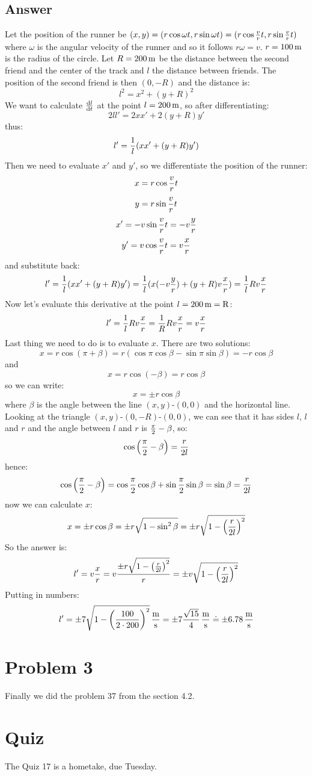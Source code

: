 \documentclass[10pt]{article}
\begin{document}
\subsection*{Answer}

Let the position of the runner be $(x, y)
= (r\cos\omega t, r\sin\omega t)
= (r\cos{v\over r} t, r\sin{v\over r} t)
$
where $\omega$ is the angular velocity of the runner and so it follows
$r\omega=v$. $r=100\rm\,m$ is the radius of the circle. Let $R=200\rm\,m$ be
the distance between the second friend and the center of the track and $l$ the
distance between friends. The position of the second friend is then $(0, -R)$
and the distance is:
$$l^2 = x^2+(y+R)^2$$
We want to calculate ${{\rm d} l\over{\rm d} t}$ at the point $l=200\rm\,m$, so after
differentiating:
$$2ll' = 2xx'+2(y+R)y'$$
thus:
$$l' ={1\over l}( xx'+(y+R)y')$$
Then we need to evaluate $x'$ and $y'$, so we differentiate the position of the
runner:
$$x = r\cos{v\over r} t$$
$$y = r\sin{v\over r} t$$
$$x' = -v\sin{v\over r} t=-v{y\over r}$$
$$y' = v\cos{v\over r} t=v{x\over r}$$
and substitute back:
$$l' =
{1\over l}( xx'+(y+R)y')=
{1\over l}( x(-v{y\over r})+(y+R)v{x\over r})=
{1\over l} Rv{x\over r}
$$
Now let's evaluate this derivative at the point $l=200\rm\,m=R$:
$$l' =
{1\over l} Rv{x\over r}=
{1\over R} Rv{x\over r}=
v{x\over r}
$$
Last thing we need to do is to evaluate $x$. There are two solutions:
$$x = r\cos(\pi+\beta)=r(\cos\pi\cos\beta-\sin\pi\sin\beta)=-r\cos\beta
$$
and
$$x = r\cos(-\beta)=r\cos\beta$$
so we can write:
$$x = \pm r\cos\beta$$
where $\beta$ is the angle between the line $(x, y)$-$(0,0)$ and the horizontal
line. Looking at the triangle $(x, y)$-$(0, -R)$-$(0, 0)$, we can see that it
has sides $l$, $l$ and $r$ and the angle between $l$ and $r$ is ${\pi\over
2}-\beta$, so:
$$\cos\left({\pi\over 2}-\beta\right)={r\over2l}$$
hence:
$$
\cos\left({\pi\over 2}-\beta\right)=
\cos{\pi\over 2}\cos\beta+\sin{\pi\over 2}\sin\beta=
\sin\beta={r\over2l}$$
now we can calculate $x$:
$$x = \pm r\cos\beta
=\pm r\sqrt{1-\sin^2\beta}
=\pm r\sqrt{1-\left({r\over2l}\right)^2}
$$
So the answer is:
$$l' =
v{x\over r}=
v{\pm r\sqrt{1-\left({r\over2l}\right)^2}\over r}=
\pm v\sqrt{1-\left({r\over2l}\right)^2}
$$
Putting in numbers:
$$l' =
\pm 7\sqrt{1-\left({100\over2\cdot200}\right)^2}{\rm\,{m\over s}}
=
\pm 7{\sqrt{15}\over4}{\rm\,{m\over s}}
\doteq
\pm 6.78{\rm\,{m\over s}}
$$

\section{Problem 3}

Finally we did the problem 37 from the section 4.2.

\section{Quiz}

The Quiz 17 is a hometake, due Tuesday.
\end{document}
